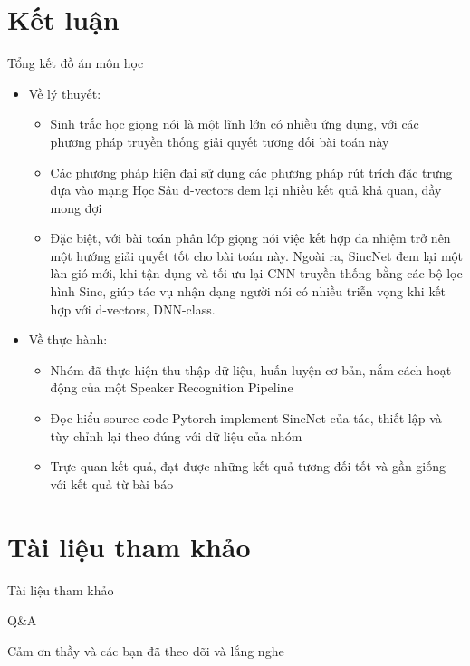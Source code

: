 \documentclass[notheorems, aspectratio=54]{beamer}
\begin{document}
\section{Kết luận}
\begin{frame}{Tổng kết đồ án môn học}
	\begin{itemize}
		\item Về lý thuyết:
		\begin{itemize}
			\item Sinh trắc học giọng nói là một lĩnh lớn có nhiều ứng dụng, với các phương pháp truyền thống giải quyết tương đối bài toán này
			\item Các phương pháp hiện đại sử dụng các phương pháp rút trích đặc trưng dựa vào mạng Học Sâu d-vectors đem lại nhiều kết quả khả quan, đầy mong đợi
			\item Đặc biệt, với bài toán phân lớp giọng nói việc kết hợp đa nhiệm trở nên một hướng giải quyết tốt cho bài toán này. Ngoài ra, SincNet đem lại một làn gió mới, khi tận dụng và tối ưu lại CNN truyền thống bằng các bộ lọc hình Sinc, giúp tác vụ nhận dạng người nói có nhiều triễn vọng khi kết hợp với d-vectors, DNN-class.
		\end{itemize} 
		\item Về thực hành:
		\begin{itemize}
			\item Nhóm đã thực hiện thu thập dữ liệu, huấn luyện cơ bản, nắm cách hoạt động của một Speaker Recognition Pipeline
			\item Đọc hiểu source code Pytorch implement SincNet của tác, thiết lập và tùy chỉnh lại theo đúng với dữ liệu của nhóm
			\item Trực quan kết quả, đạt được những kết quả tương đối tốt và gần giống với kết quả từ bài báo
		\end{itemize}
	\end{itemize}
\end{frame}
\section{Tài liệu tham khảo}
\begin{frame}{Tài liệu tham khảo}
	\nocite{*}
	\newpage\cleardoublepage
	
\end{frame}


\begin{frame}{Q\&A}
	\begin{center}
		\Huge Cảm ơn thầy và các bạn đã theo dõi và lắng nghe
	\end{center}
\end{frame}
\end{document}
